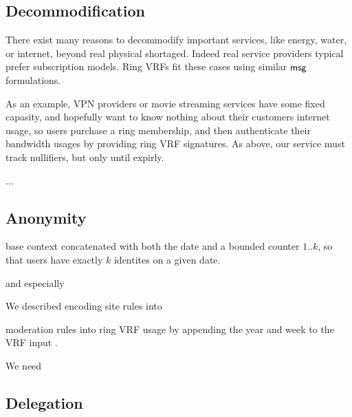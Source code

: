 \subsection{Decommodification}

There exist many reasons to decommodify important services,
like energy, water, or internet, beyond real physical shortaged.
Indeed real service providers typical prefer subscription models.
Ring VRFs fit these cases using similar $\mathsf{msg}$ formulations.

As an example, VPN providers or movie streaming services have some
fixed capasity, and hopefully want to know nothing about their
customers internet usage, so users purchase a ring membership, and
then authenticate their bandwidth usages by providing ring VRF signatures.
As above, our service must track nullifiers, but only until expirly.

...


\subsection{Anonymity }



base context concatenated with both
the date and a bounded counter $1..k$, so that users have exactly $k$
identites on a given date.



and especially 

We described encoding site rules into 

moderation rules
into ring VRF usage by appending the year and week to the VRF input \msg.

We need 











\subsection{Delegation}



